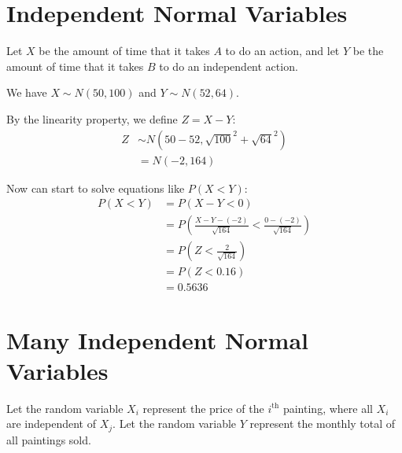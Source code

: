             \section{Independent Normal Variables} %
            \label{sec:independent_normal_variables}
                Let $X$ be the amount of time that it takes $A$ to do an action, and let $Y$ be the amount of time that it takes $B$ to do an independent action.

                We have $X \sim N(50, 100)$ and $Y \sim N(52, 64)$.

                By the linearity property, we define $Z = X - Y$:
                \begin{align*}
                    Z &\sim N(50 - 52, \sqrt{100}^2 + \sqrt{64}^2) \\
                    &= N(-2, 164)
                \end{align*}

                Now can start to solve equations like $P(X < Y)$:
                \begin{align*}
                    P(X < Y) &= P(X - Y < 0) \\
                    &= P(\frac{X - Y - (-2)}{\sqrt{164}} < \frac{0 - (-2)}{\sqrt{164}}) \\
                    &= P(Z < \frac{2}{\sqrt{164}}) \\
                    &= P(Z < 0.16) \\
                    &= 0.5636
                \end{align*}
            \section{Many Independent Normal Variables} %
            \label{sec:many_independent_normal_variables}
                Let the random variable $X_i$ represent the price of the $i^{\text{th}}$ painting, where all $X_i$ are independent of $X_j$.
                Let the random variable $Y$ represent the monthly total of all paintings sold.

